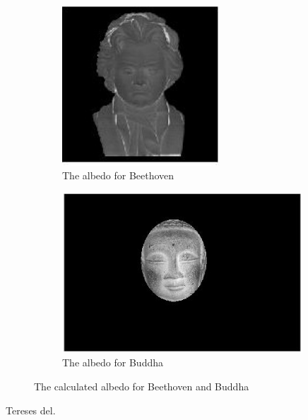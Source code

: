 \documentclass[12pt,a4paper,oneside,final]{article}
\begin{document}
\begin{figure}[H]
	\centering
	\begin{subfigure}{.5\textwidth}
		\centering
		\includegraphics[height=6cm]{BeethovenAlbedo}
		\caption{The albedo for Beethoven}
	\end{subfigure}%
	\begin{subfigure}{.5\textwidth}
		\centering
		\includegraphics[height=6cm]{BuddhaAlbedo}
		\caption{The albedo for Buddha}
	\end{subfigure}
	\caption{The calculated albedo for Beethoven and Buddha}
	\label{fig:albedo}
\end{figure}

Tereses del.
\end{document}
